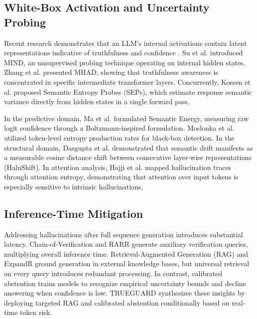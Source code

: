 \documentclass[journal]{IEEEtran}
\begin{document}
\subsection{White-Box Activation and Uncertainty Probing}
Recent research demonstrates that an LLM's internal activations contain latent representations indicative of truthfulness and confidence \cite{azaria2023internal}. Su et al. \cite{su2024mind} introduced MIND, an unsupervised probing technique operating on internal hidden states. Zhang et al. \cite{zhang2025mhad} presented MHAD, showing that truthfulness awareness is concentrated in specific intermediate transformer layers. Concurrently, Kossen et al. \cite{kossen2024semantic} proposed Semantic Entropy Probes (SEPs), which estimate response semantic variance directly from hidden states in a single forward pass.

In the predictive domain, Ma et al. \cite{ma2025semantic} formulated Semantic Energy, measuring raw logit confidence through a Boltzmann-inspired formulation. Moslonka et al. \cite{moslonka2025learned} utilized token-level entropy production rates for black-box detection. In the structural domain, Dasgupta et al. \cite{dasgupta2025hallushift} demonstrated that semantic drift manifests as a measurable cosine distance shift between consecutive layer-wise representations (HaluShift). In attention analysis, Hajji et al. \cite{hajji2025map} mapped hallucination traces through attention entropy, demonstrating that attention over input tokens is especially sensitive to intrinsic hallucinations.

\subsection{Inference-Time Mitigation}
Addressing hallucinations after full sequence generation introduces substantial latency. Chain-of-Verification \cite{dhuliawala2024chain} and RARR \cite{gao2023rarr} generate auxiliary verification queries, multiplying overall inference time. Retrieval-Augmented Generation (RAG) \cite{lewis2020retrieval} and ExpandR \cite{yao2025expandr} ground generation in external knowledge bases, but universal retrieval on every query introduces redundant processing. In contrast, calibrated abstention \cite{wu2025mitigating} trains models to recognize empirical uncertainty bounds and decline answering when confidence is low. TRUEGUARD synthesizes these insights by deploying targeted RAG and calibrated abstention conditionally based on real-time token risk.
\end{document}
